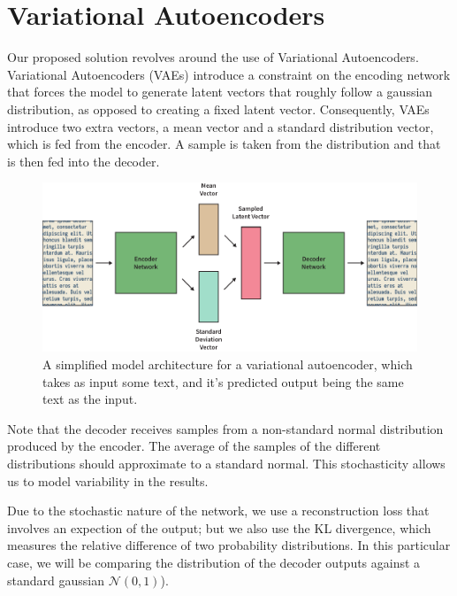 \documentclass[12pt,twoside]{report}
\begin{document}


\section{Variational Autoencoders}

Our proposed solution revolves around the use of Variational Autoencoders. Variational Autoencoders (VAEs) introduce a constraint on the encoding network that forces the model to generate latent vectors that roughly follow a gaussian distribution, as opposed to creating a fixed latent vector. Consequently, VAEs introduce two extra vectors, a mean vector and a standard distribution vector, which is fed from the encoder. A sample is taken from the distribution and that is then fed into the decoder.

\begin{figure}[!ht]
      
	\centering
	\includegraphics[width=150mm]{diagrams/variational_autoencoders.pdf}
	\caption{A simplified model architecture for a variational autoencoder, which takes as input some text, and it's predicted output being the same text as the input.\label{vae}}
  \end{figure}

  Note that the decoder receives samples from a non-standard normal distribution produced by the encoder. The average of the samples of the different distributions should approximate to a standard normal. This stochasticity allows us to model variability in the results. 
  
  Due to the stochastic nature of the network, we use a reconstruction loss that involves an expection of the output; but we also use the KL divergence, which  measures the relative difference of two probability distributions. In this particular case, we will be comparing the distribution of the decoder outputs against a standard gaussian $ \mathcal{N}(0,1)$).
  
\end{document}
